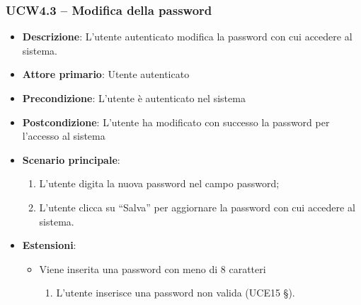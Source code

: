 \subsubsection{UCW4.3 – Modifica della password}
\begin{itemize}
\item \textbf{Descrizione}: L'utente autenticato modifica la password con cui accedere al sistema.
\item \textbf{Attore primario}: Utente autenticato
\item \textbf{Precondizione}: L’utente è autenticato nel sistema
\item \textbf{Postcondizione}: L’utente ha modificato con successo la password per l’accesso al sistema

\item \textbf{Scenario principale}:
\begin{enumerate}
\item L’utente digita la nuova password nel campo password;
\item L’utente clicca su “Salva” per aggiornare la password con cui accedere al sistema.
\end{enumerate}

\item \textbf{Estensioni}:
\begin{itemize}
\item Viene inserita una password con meno di 8 caratteri
\begin{enumerate}
	\item L'utente inserisce una password non valida (UCE15 §).
\end{enumerate}
\end{itemize}
\end{itemize}

\pagebreak